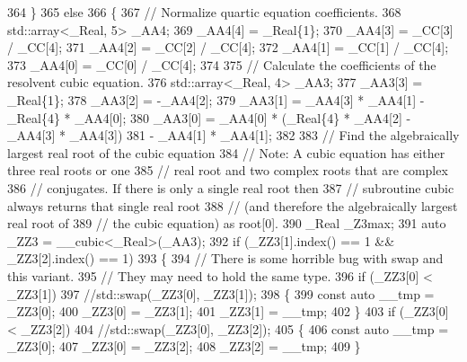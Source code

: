 \begin{DoxyCode}
364         \}
365       \textcolor{keywordflow}{else}
366         \{
367           \textcolor{comment}{// Normalize quartic equation coefficients.}
368           std::array<\_Real, 5> \_AA4;
369           \_AA4[4] = \_Real\{1\};
370           \_AA4[3] = \_CC[3] / \_CC[4];
371           \_AA4[2] = \_CC[2] / \_CC[4];
372           \_AA4[1] = \_CC[1] / \_CC[4];
373           \_AA4[0] = \_CC[0] / \_CC[4];
374 
375           \textcolor{comment}{// Calculate the coefficients of the resolvent cubic equation.}
376           std::array<\_Real, 4> \_AA3;
377           \_AA3[3] = \_Real\{1\};
378           \_AA3[2] = -\_AA4[2];
379           \_AA3[1] = \_AA4[3] * \_AA4[1] - \_Real\{4\} * \_AA4[0];
380           \_AA3[0] = \_AA4[0] * (\_Real\{4\} * \_AA4[2] - \_AA4[3] * \_AA4[3])
381                   - \_AA4[1] * \_AA4[1];
382 
383           \textcolor{comment}{// Find the algebraically largest real root of the cubic equation}
384           \textcolor{comment}{// Note: A cubic equation has either three real roots or one}
385           \textcolor{comment}{//       real root and two complex roots that are complex}
386           \textcolor{comment}{//       conjugates. If there is only a single real root then}
387           \textcolor{comment}{//       subroutine cubic always returns that single real root}
388           \textcolor{comment}{//       (and therefore the algebraically largest real root of}
389           \textcolor{comment}{//       the cubic equation) as root[0].}
390           \_Real \_Z3max;
391           \textcolor{keyword}{auto} \_ZZ3 = \_\_cubic<\_Real>(\_AA3);
392           \textcolor{keywordflow}{if} (\_ZZ3[1].index() == 1 && \_ZZ3[2].index() == 1)
393             \{
394               \textcolor{comment}{// There is some horrible bug with swap and this variant.}
395               \textcolor{comment}{// They may need to hold the same type.}
396               \textcolor{keywordflow}{if} (\_ZZ3[0] < \_ZZ3[1])
397                 \textcolor{comment}{//std::swap(\_ZZ3[0], \_ZZ3[1]);}
398                 \{
399                   \textcolor{keyword}{const} \textcolor{keyword}{auto} \_\_tmp = \_ZZ3[0];
400                   \_ZZ3[0] = \_ZZ3[1];
401                   \_ZZ3[1] = \_\_tmp;
402                 \}
403               \textcolor{keywordflow}{if} (\_ZZ3[0] < \_ZZ3[2])
404                 \textcolor{comment}{//std::swap(\_ZZ3[0], \_ZZ3[2]);}
405                 \{
406                   \textcolor{keyword}{const} \textcolor{keyword}{auto} \_\_tmp = \_ZZ3[0];
407                   \_ZZ3[0] = \_ZZ3[2];
408                   \_ZZ3[2] = \_\_tmp;
409                 \}

\end{DoxyCode}
